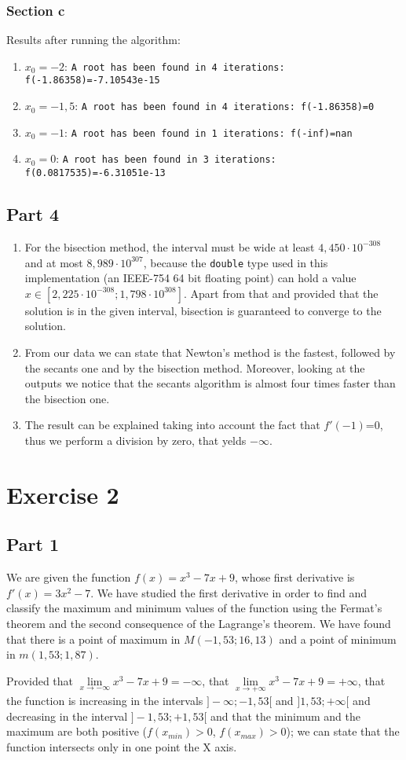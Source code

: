 \documentclass[a4paper,12pt]{article}
\begin{document}
\subsubsection{Section c}
Results after running the algorithm:
\begin{enumerate}
    \item $x_0=-2$: \verb|A root has been found in 4 iterations: f(-1.86358)=-7.10543e-15|
    \item $x_0=-1,5$: \verb|A root has been found in 4 iterations: f(-1.86358)=0|
    \item $x_0=-1$: \verb|A root has been found in 1 iterations: f(-inf)=nan|
    \item $x_0=0$: \verb|A root has been found in 3 iterations: f(0.0817535)=-6.31051e-13|
\end{enumerate}
\subsection{Part 4}
     \begin{enumerate}
          \item For the bisection method, the interval must be wide at least $4,450\cdot 10^{-308}$ and at most $8,989\cdot 10^307$, because the \texttt{double} type used in this implementation (an IEEE-754 64 bit floating point) can hold a value $x \in [2,225\cdot 10^{-308};1,798\cdot10^{308}]$. Apart from that and provided that the solution is in the given interval, bisection is guaranteed to converge to the solution.
          \item From our data we can state that Newton's method is the fastest, followed by the secants one and by the bisection method. Moreover, looking at the outputs we notice that the secants algorithm is almost four times faster than the bisection one.
          \item The result can be explained taking into account the fact that $f'(-1)$=0, thus we perform a division by zero, that yelds $-\infty$.
     \end{enumerate}
\section{Exercise 2}
     \subsection{Part 1}
          \par We are given the function $f(x)=x^3-7x+9$, whose first derivative is $f'(x)=3x^2-7$. We have studied the first derivative in order to find and classify the maximum and minimum values of the function using the Fermat's theorem and the second consequence of the Lagrange's theorem. We have found that there is a point of maximum in $M(-1,53;16,13)$ and a point of minimum in $m(1,53;1,87)$.
          \par Provided that $\lim\limits_{x \to -\infty} x^3-7x+9 = -\infty$, that $\lim\limits_{x \to +\infty} x^3-7x+9 = +\infty$, that the function is increasing in the intervals $]-\infty;-1,53[$ and $]1,53;+\infty[$ and decreasing in the interval $]-1,53;+1,53[$ and that the minimum and the maximum are both positive ($f(x_{min})>0$, $f(x_{max})>0$); we can state that the function intersects only in one point the X axis.
\end{document}
